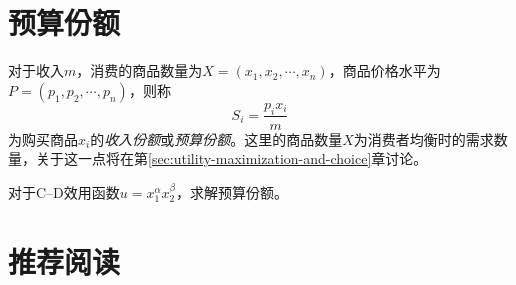 \section{预算份额}

对于收入$m$，消费的商品数量为$X=(x_1,x_2, \cdots, x_n)$，商品价格水平为$P=(p_1,p_2, \cdots, p_n)$，则称
\begin{equation}
S_i = \frac{p_i x_i}{m}
\label{eq:yusuanfene}
\end{equation}
为购买商品$x_i$的\emph{收入份额}或\emph{预算份额}。这里的商品数量$X$为消费者均衡时的需求数量，关于这一点将在第\ref{sec:utility-maximization-and-choice}章讨论。

对于C--D效用函数$u=x_1^\alpha x_2^\beta$，求解预算份额。

\section*{推荐阅读}
